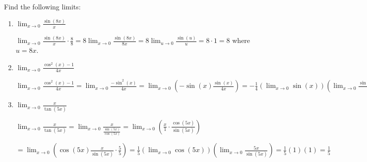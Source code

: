 \documentclass[handout,nooutcomes]{ximera}
\begin{document}
\begin{problem}
Find the following limits:

	\begin{enumerate}
	
	\item  $\lim_{x \to 0} \frac{\sin(8x)}{x}$
			\begin{freeResponse}
			$\lim_{x \to 0} \frac{\sin(8x)}{x} \cdot \frac{8}{8}
			= 8 \lim_{x \to 0} \frac{\sin(8x)}{8x}
			= 8 \lim_{u \to 0} \frac{\sin(u)}{u}
			= 8 \cdot 1 = 8$  where $u = 8x$.  
			\end{freeResponse}
			
			
			
	\item  $\lim_{x \to 0} \frac{\cos^2(x) - 1}{4x}$
			\begin{freeResponse}
			$\lim_{x \to 0} \frac{\cos^2(x) - 1}{4x}
			= \lim_{x \to 0} \frac{- \sin^2(x)}{4x}
			= \lim_{x \to 0} \left(- \sin(x) \frac{\sin(x)}{4x} \right)
			= - \frac{1}{4} \left( \lim_{x \to 0} \sin(x) \right) \left( \lim_{x \to 0} \frac{\sin(x)}{x} \right)
			= - \frac{1}{4} (0) (1) = 0$
			\end{freeResponse}
			
			
			
	\item  $\lim_{x \to 0} \frac{x}{\tan(5x)}$
			\begin{freeResponse}
			$\lim_{x \to 0} \frac{x}{\tan(5x)}
			= \lim_{x \to 0} \frac{x}{\frac{\sin(5x)}{\cos(5x)}}
			= \lim_{x \to 0} \left( \frac{x}{1} \cdot \frac{\cos(5x)}{\sin(5x)} \right)$
			
			$= \lim_{x \to 0} \left( \cos(5x) \frac{x}{\sin(5x)} \cdot \frac{5}{5} \right)
			= \frac{1}{5} \left( \lim_{x \to 0} \cos(5x) \right) \left( \lim_{x \to 0} \frac{5x}{\sin(5x)} \right)
			= \frac{1}{5} (1) (1) = \frac{1}{5}$
			\end{freeResponse}
			
			
			
	\end{enumerate}
\end{problem}
	
	
	
	
			
			
\end{document}
